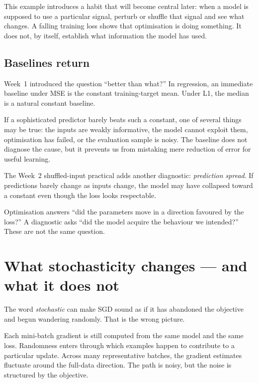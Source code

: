 This example introduces a habit that will become central later: when a model is supposed to use a particular signal, perturb or shuffle that signal and see what changes. A falling training loss shows that optimisation is doing something. It does not, by itself, establish what information the model has used.

\subsection{Baselines return}

Week~1 introduced the question ``better than what?'' In regression, an immediate baseline under MSE is the constant training-target mean. Under L1, the median is a natural constant baseline.

If a sophisticated predictor barely beats such a constant, one of several things may be true: the inputs are weakly informative, the model cannot exploit them, optimisation has failed, or the evaluation sample is noisy. The baseline does not diagnose the cause, but it prevents us from mistaking mere reduction of error for useful learning.

The Week~2 shuffled-input practical adds another diagnostic: \emph{prediction spread}. If predictions barely change as inputs change, the model may have collapsed toward a constant even though the loss looks respectable.

\begin{keyidea}
Optimisation answers ``did the parameters move in a direction favoured by the loss?'' A diagnostic asks ``did the model acquire the behaviour we intended?'' These are not the same question.
\end{keyidea}

\section{What stochasticity changes --- and what it does not}

The word \emph{stochastic} can make SGD sound as if it has abandoned the objective and begun wandering randomly. That is the wrong picture.

Each mini-batch gradient is still computed from the same model and the same loss. Randomness enters through which examples happen to contribute to a particular update. Across many representative batches, the gradient estimates fluctuate around the full-data direction. The path is noisy, but the noise is structured by the objective.


